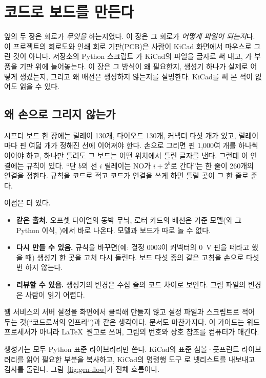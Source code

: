 \chapter{코드로 보드를 만든다}\label{ch:boardgen}

앞의 두 장은 회로가 \emph{무엇을} 하는지였다. 이 장은 그 회로가 \emph{어떻게 파일이 되는지}다. 이 프로젝트의
회로도와 인쇄 회로 기판(PCB)은 사람이 KiCad 화면에서 마우스로 그린 것이 아니다. 저장소의 Python 스크립트
가 KiCad의 파일을 글자로 써 내고, 가 부품을 기판 위에 늘어놓는다. 이 장은 그
방식이 왜 필요한지, 생성기 하나가 실제로 어떻게 생겼는지, 그리고 왜 배선은 생성하지 않는지를 설명한다.
KiCad를 써 본 적이 없어도 읽을 수 있다.

\section{왜 손으로 그리지 않는가}\label{sec:gen-why}

\Why 시프터 보드 한 장에는 릴레이 130개, 다이오드 130개, 커넥터 다섯 개가 있고, 릴레이마다 핀 여덟 개가
정해진 선에 이어져야 한다. 손으로 그리면 핀 1,000여 개를 하나씩 이어야 하고, 하나만 틀려도 그 보드는 어떤
위치에서 틀린 글자를 낸다. 그런데 이 연결에는 규칙이 있다. ``단 $b$의 선 $i$ 릴레이는 NO가 $i + 2^b$로
간다''는 한 줄이 260개의 연결을 정한다. 규칙을 코드로 적고 코드가 연결을 쓰게 하면 틀릴 곳이 그 한 줄로 준다.

이점은 더 있다.
\begin{itemize}
\item \textbf{같은 출처.} 오프셋 다이얼의 동박 무늬, 로터 카드의 배선은 기준 모델(와 그 Python 이식,
)에서 바로 나온다. 모델과 보드가 따로 놀 수 없다.
\item \textbf{다시 만들 수 있음.} 규칙을 바꾸면(예: 결정 0003이 커넥터의 0~V 핀을 떼라고 했을 때) 생성기 한 곳을
고쳐 다시 돌린다. 보드 다섯 종의 같은 고침을 손으로 다섯 번 하지 않는다.
\item \textbf{리뷰할 수 있음.} 생성기의 변경은 수십 줄의 코드 차이로 보인다. 그림 파일의 변경은 사람이 읽기
어렵다.
\end{itemize}

\General 웹 서비스의 서버 설정을 화면에서 클릭해 만들지 않고 설정 파일과 스크립트로 적어 두는 것(``코드로서의
인프라'')과 같은 생각이다. 문서도 마찬가지다. 이 가이드는 워드프로세서가 아니라 \LaTeX\ 원고로 쓰여, 그림의
번호와 상호 참조를 컴퓨터가 매긴다.

\Ours 생성기는 모두 Python 표준 라이브러리만 쓴다. KiCad의 표준 심볼·풋프린트 라이브러리를 읽어 필요한
부분을 복사하고, KiCad의 명령행 도구 로 넷리스트를 내보내고 검사를 돌린다.
그림~\ref{fig:gen-flow}가 전체 흐름이다.

